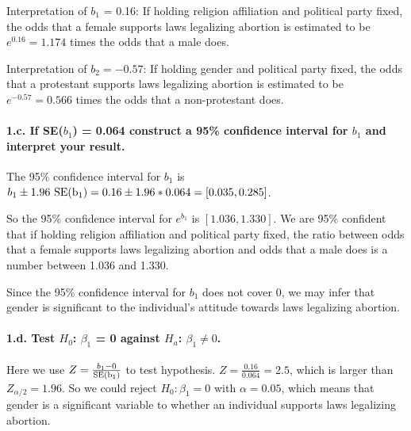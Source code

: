 \documentclass[]{article}
\let\oldparagraph\paragraph
\renewcommand{\paragraph}[1]{\oldparagraph{#1}\mbox{}}
\begin{document}
Interpretation of \(b_1\) = 0.16: If holding religion affiliation and
political party fixed, the odds that a female supports laws legalizing
abortion is estimated to be \(e^{0.16} = 1.174\) times the odds that a
male does.

Interpretation of \(b_2 = -0.57\): If holding gender and political party
fixed, the odds that a protestant supports laws legalizing abortion is
estimated to be \(e^{-0.57} = 0.566\) times the odds that a
non-protestant does.

\hypertarget{c.-if-seb_1-0.064-construct-a-95-confidence-interval-for-b_1-and-interpret-your-result.}{%
\paragraph{\texorpdfstring{1.c. If SE(\(b_1\)) = 0.064 construct a 95\%
confidence interval for \(b_1\) and interpret your
result.}{1.c. If SE(b\_1) = 0.064 construct a 95\% confidence interval for b\_1 and interpret your result.}}\label{c.-if-seb_1-0.064-construct-a-95-confidence-interval-for-b_1-and-interpret-your-result.}}

The 95\% confidence interval for \(b_1\) is
\(b_1 \pm 1.96\ \rm{SE}(b_1) = 0.16 \pm 1.96*0.064 = [0.035, 0.285]\).

So the 95\% confidence interval for \(e^{b_1}\) is \([1.036, 1.330]\).
We are 95\% confident that if holding religion affiliation and political
party fixed, the ratio between odds that a female supports laws
legalizing abortion and odds that a male does is a number between 1.036
and 1.330.

Since the 95\% confidence interval for \(b_1\) does not cover 0, we may
infer that gender is significant to the individual's attitude towards
laws legalizing abortion.

\hypertarget{d.-test-h_0-beta_1-0-against-h_a-beta_1-neq-0.}{%
\paragraph{\texorpdfstring{1.d. Test \(H_0\): \(\beta_1\) = 0 against
\(H_a\):
\(\beta_1 \neq 0\).}{1.d. Test H\_0: \textbackslash{}beta\_1 = 0 against H\_a: \textbackslash{}beta\_1 \textbackslash{}neq 0.}}\label{d.-test-h_0-beta_1-0-against-h_a-beta_1-neq-0.}}

Here we use \(Z = \frac{b_1 - 0}{\rm{SE}(b_1)}\) to test hypothesis.
\(Z = \frac{0.16}{0.064} = 2.5\), which is larger than
\(Z_{\alpha/2} = 1.96\). So we could reject \(H_0: \beta_1 = 0\) with
\(\alpha = 0.05\), which means that gender is a significant variable to
whether an individual supports laws legalizing abortion.
\end{document}
